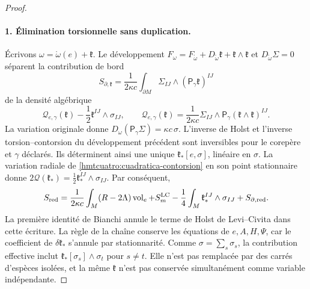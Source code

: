 \begin{proof}
\paragraph{1. Élimination torsionnelle sans duplication.}
Écrivons \(\omega=\mathring\omega(e)+\mathfrak k\). Le développement \(F_\omega=F_{\mathring\omega}
+D_{\mathring\omega}\mathfrak k+\mathfrak k\wedge\mathfrak k\) et \(D_{\mathring\omega}\Sigma=0\) séparent la contribution de bord
\[
 S_{\partial,\mathfrak k}
 =\frac1{2\kappa c}\int_{\partial M}
                  \Sigma_{IJ}\wedge(\mathsf P_\gamma\mathfrak k)^{IJ}
\]
de la densité algébrique
\begin{equation}
 \mathcal Q_{e,\gamma}(\mathfrak k)
       -\frac12\mathfrak k^{IJ}\wedge\sigma_{IJ},\qquad
 \mathcal Q_{e,\gamma}(\mathfrak k)=\frac1{2\kappa c}
       \Sigma_{IJ}\wedge
       \mathsf P_\gamma(\mathfrak k\wedge\mathfrak k)^{IJ}.
 \label{hmtcuatro:cuadratica-contorsion}
\end{equation}
La variation originale donne \(D_\omega(\mathsf P_\gamma\Sigma)=\kappa c\,\sigma\). L’inverse de Holst et l’inverse torsion--contorsion du développement précédent sont inversibles pour le corepère et \(\gamma\) déclarés. Ils déterminent ainsi une unique \(\mathfrak k_*[e,\sigma]\), linéaire en \(\sigma\). La variation radiale de \eqref{hmtcuatro:cuadratica-contorsion} en son point stationnaire donne \(2\mathcal Q(\mathfrak k_*)=\frac12\mathfrak k_*^{IJ}\wedge\sigma_{IJ}\). Par conséquent,
\begin{equation}
 S_{\rm red}=\frac1{2\kappa c}\int_M(R-2\Lambda)\operatorname{vol}_e
       +S_m^{\rm LC}
       -\frac14\int_M\mathfrak k_*^{IJ}\wedge\sigma_{IJ}
       +S_{\partial,\rm red}.
 \label{hmtcuatro:accion-reducida}
\end{equation}
La première identité de Bianchi annule le terme de Holst de Levi--Civita dans cette écriture. La règle de la chaîne conserve les équations de \(e,A,H,\Psi\), car le coefficient de \(\delta\mathfrak k_*\) s’annule par stationnarité. Comme \(\sigma=\sum_s\sigma_s\), la contribution effective inclut \(\mathfrak k_*[\sigma_s]\wedge\sigma_t\) pour \(s\ne t\). Elle n’est pas remplacée par des carrés d’espèces isolées, et la même \(\mathfrak k\) n’est pas conservée simultanément comme variable indépendante.


\end{proof}
